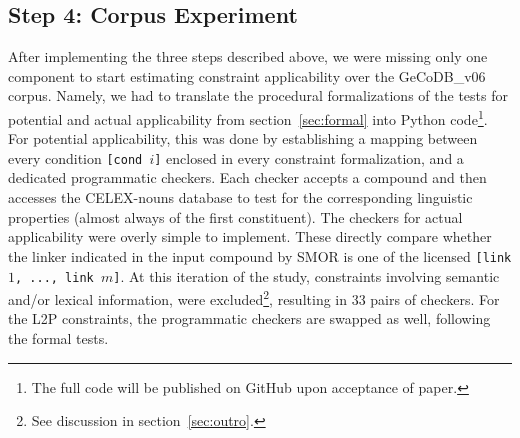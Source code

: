 \documentclass[10pt, a4paper]{article}
\newcommand{\zeroLinker}{\ensuremath{\boldsymbol{\varnothing}}}
\begin{document}
\subsection{Step 4: Corpus Experiment}
\label{sec:exp}

After implementing the three steps described above, we were missing only one component to start estimating constraint applicability over the GeCoDB\_v06 corpus. Namely, we had to translate the procedural formalizations of the tests for potential and actual applicability from section~\ref{sec:formal} into Python code\footnote{The full code will be published on GitHub upon acceptance of paper.}. For potential applicability, this was done by establishing a mapping between every condition \mbox{\texttt{[cond $i$]}} enclosed in every constraint formalization, and a dedicated programmatic checkers. Each checker accepts a compound and then accesses the CELEX-nouns database to test for the corresponding linguistic properties (almost always of the first constituent). The checkers for actual applicability were overly simple to implement. These directly compare whether the linker indicated in the input compound by SMOR is one of the licensed \mbox{\texttt{[link $1$, ..., link $m$]}}. At this iteration of the study, constraints involving semantic and/or lexical information, were excluded\footnote{See discussion in section~\ref{sec:outro}.}, resulting in 33 pairs of checkers. For the L2P constraints, the programmatic checkers are swapped as well, following the formal tests.

\end{document}
